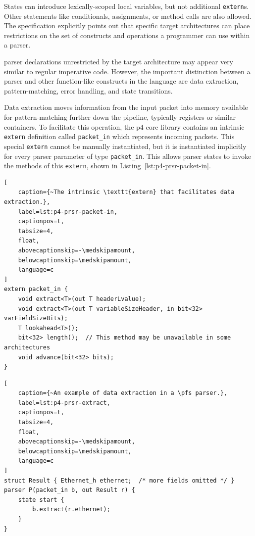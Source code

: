 States can introduce lexically-scoped local variables, but not additional
\texttt{extern}s. Other statements like conditionals, assignments, or method
calls are also allowed. The specification explicitly points out that specific
target architectures can place restrictions on the set of constructs and
operations a programmer can use within a parser.

\pfs parser declarations unrestricted by the target architecture may appear very
similar to regular imperative code. However, the important distinction between a
parser and other function-like constructs in the \pfs language are data
extraction, pattern-matching, error handling, and state transitions.

Data extraction moves information from the input packet into memory available
for pattern-matching further down the pipeline, typically registers or similar
containers. To facilitate this operation, the \acrshort{p4} core library
contains an intrinsic \texttt{extern} definition called
\texttt{packet\_in} which represents incoming packets. This special
\texttt{extern} cannot be manually instantiated, but it is instantiated implicitly for every parser
parameter of type \texttt{packet\_in}. This allows parser
states to invoke the methods of this \texttt{extern}, shown in
Listing~\ref{lst:p4-prsr-packet-in}.

\begin{lstlisting}[
	caption={~The intrinsic \texttt{extern} that facilitates data extraction.},
	label=lst:p4-prsr-packet-in,
	captionpos=t,
	tabsize=4,
	float,
	abovecaptionskip=-\medskipamount,
	belowcaptionskip=\medskipamount,
	language=c
]
extern packet_in {
	void extract<T>(out T headerLvalue);
	void extract<T>(out T variableSizeHeader, in bit<32> varFieldSizeBits);
	T lookahead<T>();
	bit<32> length();  // This method may be unavailable in some architectures
	void advance(bit<32> bits);
}
\end{lstlisting}

\begin{lstlisting}[
	caption={~An example of data extraction in a \pfs parser.},
	label=lst:p4-prsr-extract,
	captionpos=t,
	tabsize=4,
	float,
	abovecaptionskip=-\medskipamount,
	belowcaptionskip=\medskipamount,
	language=c
]
struct Result { Ethernet_h ethernet;  /* more fields omitted */ }
parser P(packet_in b, out Result r) {
	state start {
		b.extract(r.ethernet);
	}
}
\end{lstlisting}

